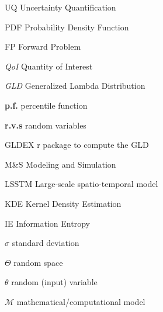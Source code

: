 \documentclass[
	12pt,				%
	openright,			%
	oneside,			%
	a4paper,			%
	sumario=tradicional,%
	brazil,			%
	french,				%
	spanish,			%
	english				%
	]{abntex2}
\theoremstyle{plain}
\theoremstyle{definition}
\begin{document}
%

%

\listoffigures*
\cleardoublepage

\listoftables*
\cleardoublepage

\begin{siglas}
  \item[UQ] Uncertainty Quantification
  \item[PDF] Probability Density Function
  \item[FP] Forward Problem
  \item[\textit{QoI}] Quantity of Interest
  \item[\textit{GLD}] Generalized Lambda Distribution
  \item[\textbf{p.f.}] percentile function
  \item[\textbf{r.v.s}] random variables
  \item[GLDEX] r package to compute the GLD 
  \item[M\&S] Modeling and Simulation
  \item[LSSTM] Large-scale spatio-temporal model
  \item[KDE] Kernel Density Estimation
  \item[IE] Information Entropy
\end{siglas}

\begin{simbolos}
  \item[$\sigma$] standard deviation
  \item[$\Theta$] random space
  \item[$\theta$] random (input) variable
  \item[$\mathcal{M}$] mathematical/computational model
\end{simbolos}
\end{document}
